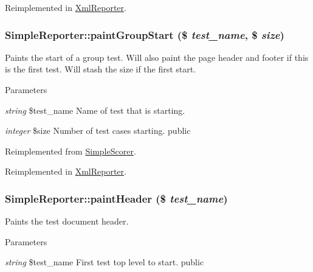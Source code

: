 Reimplemented in \hyperlink{class_xml_reporter_a448424e6e8bce6060c6ad6109fcb2300}{XmlReporter}.\hypertarget{class_simple_reporter_a3e8ad3ae451da1c3ae1e90c5789f7f2b}{
\subsubsection[{paintGroupStart}]{\setlength{\rightskip}{0pt plus 5cm}SimpleReporter::paintGroupStart (\$ {\em test\_\-name}, \/  \$ {\em size})}}
\label{class_simple_reporter_a3e8ad3ae451da1c3ae1e90c5789f7f2b}
Paints the start of a group test. Will also paint the page header and footer if this is the first test. Will stash the size if the first start. 
\begin{DoxyParams}{Parameters}
\item[{\em string}]\$test\_\-name Name of test that is starting. \item[{\em integer}]\$size Number of test cases starting.  public \end{DoxyParams}


Reimplemented from \hyperlink{class_simple_scorer_a738721074c609d1ced9010b57cd0779c}{SimpleScorer}.

Reimplemented in \hyperlink{class_xml_reporter_a8260073ecaba7369ae53fde9251d1ef5}{XmlReporter}.\hypertarget{class_simple_reporter_a682fc7003bca1442734b7ddbdf270b75}{
\subsubsection[{paintHeader}]{\setlength{\rightskip}{0pt plus 5cm}SimpleReporter::paintHeader (\$ {\em test\_\-name})}}
\label{class_simple_reporter_a682fc7003bca1442734b7ddbdf270b75}
Paints the test document header. 
\begin{DoxyParams}{Parameters}
\item[{\em string}]\$test\_\-name First test top level to start.  public  \end{DoxyParams}


